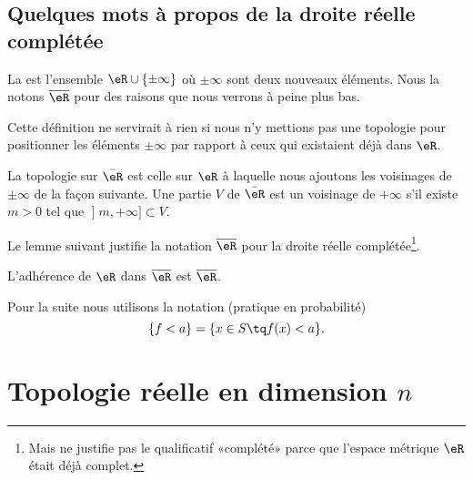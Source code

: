 \subsection{Quelques mots à propos de la droite réelle complétée} 

\begin{definition}
    La  est l'ensemble \( \eR\cup\{ \pm \infty \}\) où \( \pm\infty\) sont deux nouveaux éléments. Nous la notons \( \overline{ \eR }\) pour des raisons que nous verrons à peine plus bas.
\end{definition}

Cette définition ne servirait à rien si nous n'y mettions pas une topologie pour positionner les éléments \( \pm\infty\) par rapport à ceux qui existaient déjà dans \( \eR\).

\begin{definition}
La topologie sur \(\bar \eR\) est celle sur \( \eR\) à laquelle nous ajoutons les voisinages de \( \pm\infty\) de la façon suivante. Une partie \( V\) de \( \bar \eR\) est un voisinage de \( +\infty\) s'il existe \( m>0\) tel que \( \mathopen] m , +\infty \mathclose]\subset V\).
\end{definition}

Le lemme suivant justifie la notation \( \overline{ \eR }\) pour la droite réelle complétée\footnote{Mais ne justifie pas le qualificatif «complété» parce que l'espace métrique \( \eR\) était déjà complet.}.
\begin{lemma}       \label{LEMooPZXHooEEXsTC}
    L'adhérence de \( \eR\) dans \( \overline{ \eR }\) est \( \overline{ \eR }\).
\end{lemma}

Pour la suite nous utilisons la notation (pratique en probabilité)
\begin{equation}
    \{ f<a \}=\{ x\in S\tq f(x)<a \}.
\end{equation}

\section{Topologie réelle en dimension $n$}

